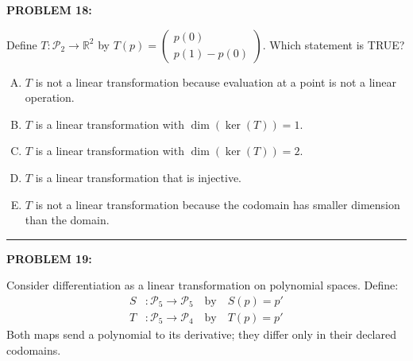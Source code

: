 \documentclass[12pt]{amsart}
\newcommand{\divider}{
  \vspace{-1em} %
  \noindent
  \raisebox{-0.15ex}{\textbullet}%
  \hspace{0.5em}%
  \rule[0.5ex]{0.95\textwidth}{1.0pt}%
  \hspace{0.5em}%
  \raisebox{-0.15ex}{\textbullet}%
  \vspace{0em} %
}
\begin{document}
{\bf PROBLEM 18:}

Define $T: \mathcal{P}_2 \to \mathbb{R}^2$ by $T(p) = \begin{pmatrix} p(0) \\ p(1) - p(0) \end{pmatrix}$. Which statement is TRUE?

\begin{enumerate}[(A)]
\item $T$ is not a linear transformation because evaluation at a point is not a linear operation.
\item $T$ is a linear transformation with $\dim(\ker(T)) = 1$.
\item $T$ is a linear transformation with $\dim(\ker(T)) = 2$.
\item $T$ is a linear transformation that is injective.
\item $T$ is not a linear transformation because the codomain has smaller dimension than the domain.
\end{enumerate}


\divider

{\bf PROBLEM 19:}

Consider differentiation as a linear transformation on polynomial spaces. Define:
\begin{align*}
S &: \mathcal{P}_5 \to \mathcal{P}_5 \quad \text{by} \quad S(p) = p' \\
T &: \mathcal{P}_5 \to \mathcal{P}_4 \quad \text{by} \quad T(p) = p'
\end{align*}
Both maps send a polynomial to its derivative; they differ only in their declared codomains.
\end{document}
